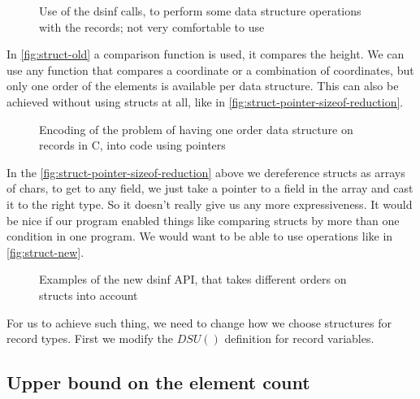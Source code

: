 \documentclass[a4paper,11pt]{article}
\begin{document}
			\begin{figure}
				

				\caption{Use of the dsinf calls, to perform some data structure operations with the
				records; not very comfortable to use}

				\label{fig:struct-old}
			\end{figure}

			In \autoref{fig:struct-old} a comparison function is used, it compares the height. We can use
			any function that compares a coordinate or a combination of coordinates, but only one order of
			the elements is available per data structure. This can also be achieved without using structs at
			all, like in \autoref{fig:struct-pointer-sizeof-reduction}.

			\begin{figure}
				

				\caption{Encoding of the problem of having one order data structure on records in C,
				into code using pointers}

				\label{fig:struct-pointer-sizeof-reduction}
			\end{figure}

			In the \autoref{fig:struct-pointer-sizeof-reduction} above we dereference structs as arrays of
			chars, to get to any field, we just take a pointer to a field in the array and cast it to the
			right type. So it doesn't really give us any more expressiveness. It would be nice if our
			program enabled things like comparing structs by more than one condition in one program. We
			would want to be able to use operations like in \autoref{fig:struct-new}.

			\begin{figure}
				

				\caption{Examples of the new dsinf API, that takes different orders on structs into
				account}

				\label{fig:struct-new}
			\end{figure}

			For us to achieve such thing, we need to change how we choose structures for record types. First
			we modify the $DSU()$ definition for record variables.

	\subsection{Upper bound on the element count}
\end{document}
